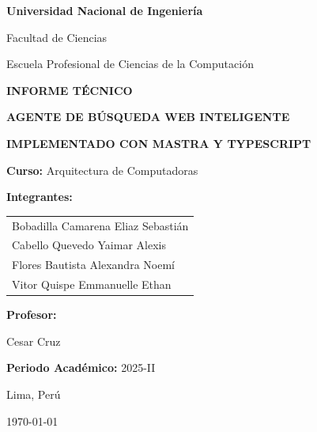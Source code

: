 \documentclass[12pt,a4paper]{article}
\begin{document}
\begin{titlepage}
    \centering
    \vspace*{1cm}

    {\Huge\bfseries Universidad Nacional de Ingeniería\par}
    \vspace{0.5cm}
    {\Large Facultad de Ciencias\par}
    \vspace{0.3cm}
    {\large Escuela Profesional de Ciencias de la Computación\par}

    \vspace{2cm}

    {\Huge\bfseries INFORME TÉCNICO\par}
    \vspace{0.5cm}
    {\LARGE\bfseries AGENTE DE BÚSQUEDA WEB INTELIGENTE\par}
    \vspace{0.3cm}
    {\LARGE\bfseries IMPLEMENTADO CON MASTRA Y TYPESCRIPT\par}

    \vspace{2cm}

    {\Large\textbf{Curso:} Arquitectura de Computadoras\par}
    \vspace{0.5cm}

    {\large\textbf{Integrantes:}\par}
    \vspace{0.3cm}
    {\large
    \begin{tabular}{l}
        Bobadilla Camarena Eliaz Sebastián \\
        Cabello Quevedo Yaimar Alexis \\
        Flores Bautista Alexandra Noemí \\
        Vitor Quispe Emmanuelle Ethan
    \end{tabular}\par}

    \vspace{1cm}

    {\large\textbf{Profesor:}\par}
    {\large Cesar Cruz\par}

    \vspace{1cm}

    {\large\textbf{Periodo Académico:} 2025-II\par}

    \vfill

    {\large Lima, Perú\par}
    {\large \today\par}
\end{titlepage}
\end{document}
